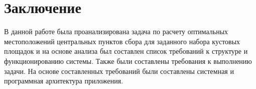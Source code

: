 \section*{\Large{Заключение}}
В данной работе была проанализирована задача по
расчету оптимальных местоположений центральных пунктов сбора
для заданного набора кустовых площадок и на основе анализа
был составлен список требований к структуре и функционированию системы.
Также были составлены требования к выполнению задачи.
На основе составленных требований были составлены системная и программная архитектура приложения.